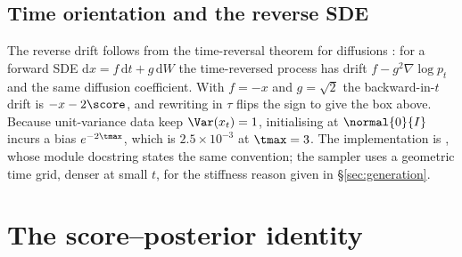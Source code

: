 \subsection{Time orientation and the reverse SDE}

\begin{center}
\end{center}

The reverse drift follows from the time-reversal theorem for diffusions
\citep{anderson1982,haussmann1986}: for a forward SDE $\mathrm{d}x = f\,\mathrm{d}t +
g\,\mathrm{d}W$ the time-reversed process has drift $f - g^2\nabla\log p_t$ and the same
diffusion coefficient. With $f=-x$ and $g=\sqrt{2}$ the backward-in-$t$ drift is
$-x - 2\score$, and rewriting in $\tau$ flips the sign to give the box above. Because unit-variance
data keep $\Var(x_t)=1$, initialising at $\normal{0}{I}$ incurs a bias $e^{-2\tmax}$, which is
$2.5\times10^{-3}$ at $\tmax=3$. The implementation is
, whose module docstring states the same convention; the sampler uses a
geometric time grid, denser at small $t$, for the stiffness reason given in
\S\ref{sec:generation}.

\section{The score--posterior identity}
\label{app:identity}

